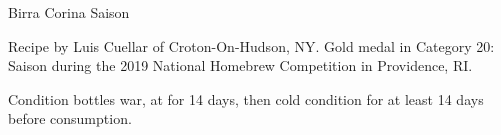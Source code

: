 \begin{recipe}{Birra Corina Saison} %

\begin{aboutblock}
Recipe by Luis Cuellar of Croton-On-Hudson, NY. Gold medal in Category 20:
Saison during the 2019 National Homebrew Competition in Providence, RI.
\sourceaha
\end{aboutblock}


\begin{methodandtiming}
 
\begin{mashsteps}
\end{mashsteps}

\begin{fermentationsteps}
\end{fermentationsteps}

\begin{directions}
Condition bottles war, at  for 14 days, then cold condition for at
least 14 days before consumption.
\end{directions}

\end{methodandtiming}

\recipebreak

\begin{ingredientsblock}

\begin{malts}
\end{malts}

\begin{hops}
\end{hops}


\end{ingredientsblock}

\end{recipe}

